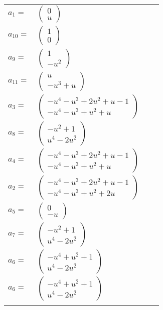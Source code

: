 \documentclass[1p]{elsarticle_modified}
\theoremstyle{definition}
\begin{document}
\begin{tabular}{m{7pt} m{180pt} m{7pt} m{180pt} }
\flushright $a_{1}=$&$\begin{pmatrix}0\\u\end{pmatrix}$ \\
\flushright $a_{10}=$&$\begin{pmatrix}1\\0\end{pmatrix}$ \\
\flushright $a_{9}=$&$\begin{pmatrix}1\\- u^2\end{pmatrix}$ \\
\flushright $a_{11}=$&$\begin{pmatrix}u\\- u^3+u\end{pmatrix}$ \\
\flushright $a_{3}=$&$\begin{pmatrix}- u^4- u^3+2 u^2+u-1\\- u^4- u^3+u^2+u\end{pmatrix}$ \\
\flushright $a_{8}=$&$\begin{pmatrix}- u^2+1\\u^4-2 u^2\end{pmatrix}$ \\
\flushright $a_{4}=$&$\begin{pmatrix}- u^4- u^3+2 u^2+u-1\\- u^4- u^3+u^2+u\end{pmatrix}$ \\
\flushright $a_{2}=$&$\begin{pmatrix}- u^4- u^3+2 u^2+u-1\\- u^4- u^3+u^2+2 u\end{pmatrix}$ \\
\flushright $a_{5}=$&$\begin{pmatrix}0\\- u\end{pmatrix}$ \\
\flushright $a_{7}=$&$\begin{pmatrix}- u^2+1\\u^4-2 u^2\end{pmatrix}$ \\
\flushright $a_{6}=$&$\begin{pmatrix}- u^4+u^2+1\\u^4-2 u^2\end{pmatrix}$\\ \flushright $a_{6}=$&$\begin{pmatrix}- u^4+u^2+1\\u^4-2 u^2\end{pmatrix}$\\&\end{tabular}
\end{document}
